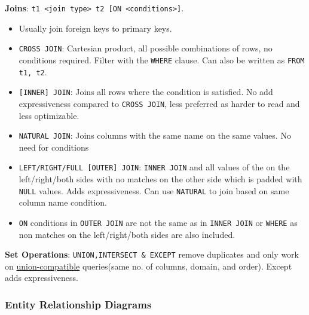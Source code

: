 \begin{multicols*}{3}
\noindent\textbf{Joins}: \texttt{t1 <join type> t2 [ON <conditions>]}. 
\begin{itemize}[leftmargin=*]
    \item              Usually join foreign keys to primary keys.
    \item \texttt{CROSS JOIN}: Cartesian product, all possible combinations of rows, no conditions required. Filter with the \texttt{WHERE} clause. Can also be written as \texttt{FROM t1, t2}.
    \item  \texttt{[INNER] JOIN}: Joins all rows where the condition is satisfied. No add expressiveness compared to \texttt{CROSS JOIN}, less preferred  as harder to read and less optimizable.
    \item \texttt{NATURAL JOIN}: Joins columns with the same name on the same values. No need for conditions
    \item \texttt{LEFT/RIGHT/FULL [OUTER] JOIN}: \texttt{INNER JOIN} and all values of the on the left/right/both sides with no matches on the other side which is padded with \texttt{NULL} values. Adds expressiveness. Can use \texttt{NATURAL} to join based on same column name condition.
    \item \texttt{ON} conditions in \texttt{OUTER JOIN} are not the same as in \texttt{INNER JOIN} or \texttt{WHERE} as non matches on the left/right/both sides are also included.
\end{itemize}

\noindent\textbf{Set Operations}: \texttt{UNION,INTERSECT \& EXCEPT} remove duplicates and only work on \underline{union-compatible} queries(same no. of columns, domain, and order). Except adds expressiveness.\\

\subsubsection{Entity Relationship Diagrams}
\end{multicols*}

